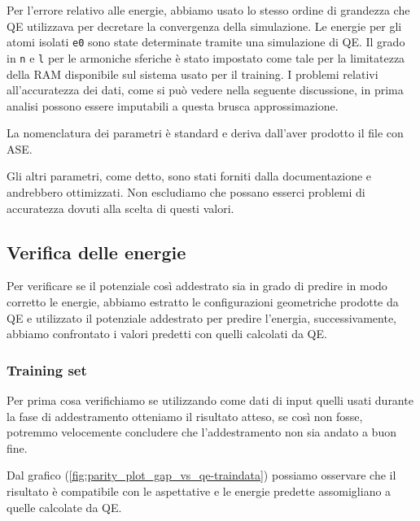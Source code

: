 \documentclass[a4paper,11pt,openany]{book}
\begin{document}
Per l'errore relativo alle energie, abbiamo usato lo stesso ordine di grandezza che QE utilizzava per decretare la convergenza della simulazione.
Le energie per gli atomi isolati \texttt{e0} sono state determinate tramite una simulazione di QE.
Il grado in \texttt{n} e \texttt{l} per le armoniche sferiche è stato impostato come tale per la limitatezza della RAM disponibile sul sistema usato per il training. I problemi relativi all'accuratezza dei dati, come si può vedere nella seguente discussione, in prima analisi possono essere imputabili a questa brusca approssimazione.


La nomenclatura dei parametri è standard e deriva dall'aver prodotto il file con ASE.

Gli altri parametri, come detto, sono stati forniti dalla documentazione e andrebbero ottimizzati. Non escludiamo che possano esserci problemi di accuratezza dovuti alla scelta di questi valori.


\subsection{Verifica delle energie}

Per verificare se il potenziale così addestrato sia in grado di predire in modo corretto le energie, abbiamo estratto le configurazioni geometriche prodotte da QE e utilizzato il potenziale addestrato per predire l'energia, successivamente, abbiamo confrontato i valori predetti con quelli calcolati da QE.

\subsubsection{Training set}

Per prima cosa verifichiamo se utilizzando come dati di input quelli usati durante la fase di addestramento otteniamo il risultato atteso, se così non fosse, potremmo velocemente concludere che l'addestramento non sia andato a buon fine.


Dal grafico (\ref{fig:parity_plot_gap_vs_qe-traindata}) possiamo osservare che il risultato è compatibile con le aspettative e le energie predette assomigliano a quelle calcolate da QE.
\end{document}
